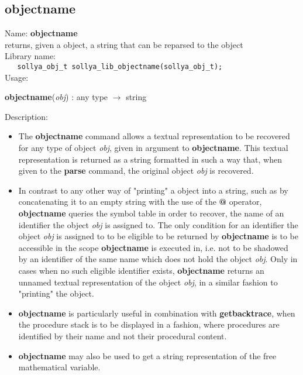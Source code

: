 \subsection{objectname}
\label{labobjectname}
\noindent Name: \textbf{objectname}\\
\phantom{aaa}returns, given a \sollya object, a string that can be reparsed to the object\\[0.2cm]
\noindent Library name:\\
\verb|   sollya_obj_t sollya_lib_objectname(sollya_obj_t);|\\[0.2cm]
\noindent Usage: 
\begin{center}
\textbf{objectname}(\emph{obj}) : \textsf{any type} $\rightarrow$ \textsf{string}\\
\end{center}
\noindent Description: \begin{itemize}

\item The \textbf{objectname} command allows a textual representation to be recovered
   for any type of \sollya object \emph{obj}, given in argument to
   \textbf{objectname}. This textual representation is returned as a string
   formatted in such a way that, when given to the \textbf{parse} command, the
   original object \emph{obj} is recovered.

\item In contrast to any other way of "printing" a \sollya object into a
   string, such as by concatenating it to an empty string with the use of
   the \textbf{@} operator, \textbf{objectname} queries the \sollya symbol table in order
   to recover, the name of an identifier the object \emph{obj} is assigned to.
   The only condition for an identifier the object \emph{obj} is assigned to
   to be eligible to be returned by \textbf{objectname} is to be accessible in the
   scope \textbf{objectname} is executed in, i.e. not to be shadowed by an identifier
   of the same name which does not hold the object \emph{obj}. Only in cases
   when no such eligible identifier exists, \textbf{objectname} returns an unnamed
   textual representation of the object \emph{obj}, in a similar fashion to
   "printing" the object.

\item \textbf{objectname} is particularly useful in combination with \textbf{getbacktrace}, when
   the \sollya procedure stack is to be displayed in a fashion, where
   procedures are identified by their name and not their procedural content.

\item \textbf{objectname} may also be used to get a string representation of the free
   mathematical variable.
\end{itemize}
